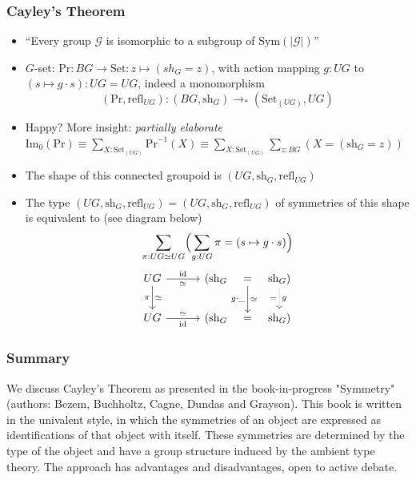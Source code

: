 \documentclass[handout,11pt]{beamer}
\newcommand{\sh}{\mathrm{sh}}
\newcommand{\refl}{\mathrm{refl}}
\newcommand{\Set}{\mathrm{Set}}
\newcommand{\id}{\mathrm{id}}
\newcommand{\im}{\mathrm{Im}_0}
\newcommand{\jdeq}{\equiv}
\newcommand{\ptdto}{\to_\ast}
\newcommand{\Symm}{\mathrm{Sym}}
\newcommand{\PrT}{\mathrm{Pr}}
\begin{document}
\begin{frame}
\frametitle{Cayley's Theorem}
 \begin{itemize}[<+->]
\item ``Every group $\mathcal G$ is isomorphic to a 
subgroup of $\Symm(|\mathcal G|)$''
\item $G$-set: $\PrT: BG\to\Set : z\mapsto (sh_G=z)$, with
action mapping $g:UG$ to $(s\mapsto g\cdot s):UG=UG$,
indeed a monomorphism
$$(\PrT,\refl_{UG}): (BG,\sh_G)\ptdto(\Set_{(UG)},UG)$$
\item Happy? More insight: \emph{partially elaborate}
$\im(\PrT)\jdeq\sum_{X:\Set_{(UG)}}\PrT^{-1}(X)
          \jdeq\sum_{X:\Set_{(UG)}}\sum_{z:BG}(X=(\sh_G=z))$\\
\item The shape of this connected groupoid is $(UG,\sh_G,\refl_{UG})$ 
\item The type $(UG,\sh_G,\refl_{UG})=(UG,\sh_G,\refl_{UG})$ of 
symmetries of this shape is equivalent to (see diagram below)
$$\sum_{\pi:UG\simeq UG}\Bigl(\sum_{g:UG} \pi = (s\mapsto g\cdot s)\Bigr)$$
\[\begin{tikzcd}[ampersand replacement=\&, column sep={1cm, between origins}]
UG\arrow[d,"\simeq","\pi"']\arrow[rr,"\simeq"',"\id"]
 \&\&(\sh_G\&=\arrow[d,"\simeq","g\cdot\_"']
 \&\sh_G)\arrow[d,dotted,"g","="']\\
UG\arrow[rr,"\simeq","\id"']\&\&(\sh_G\&=\&\sh_G)
\end{tikzcd}\]
\end{itemize}
\end{frame}

\begin{frame}
\frametitle{Summary}
We discuss Cayley's Theorem as presented in the book-in-progress "Symmetry" (authors: Bezem, Buchholtz, Cagne, Dundas and Grayson).
This book is written in the univalent style, in which the symmetries of an object are expressed as identifications of that object with itself. These symmetries are determined by the type of the object and have a group structure induced by the ambient type theory. The approach has advantages and disadvantages,
open to active debate.
\end{frame}
\end{document}
